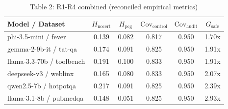 \begin{table}[h]
\centering
\small
\caption{Table 2: R1-R4 combined (reconciled empirical metrics)}
\label{tab:r1_r4_combined_old}
\begin{tabular}{l|cc|cc|c}
\hline
Model / Dataset & $H_{\mathrm{nocert}}$ & $H_{\mathrm{pcg}}$ & $\mathrm{Cov}_{\mathrm{control}}$ & $\mathrm{Cov}_{\mathrm{audit}}$ & $G_{\mathrm{safe}}$ \\
\hline
phi-3.5-mini / fever & 0.139 & 0.082 & 0.817 & 0.950 & 1.70x \\
gemma-2-9b-it / tat-qa & 0.174 & 0.091 & 0.825 & 0.950 & 1.91x \\
llama-3.3-70b / toolbench & 0.191 & 0.100 & 0.833 & 0.950 & 1.91x \\
deepseek-v3 / weblinx & 0.165 & 0.080 & 0.833 & 0.950 & 2.07x \\
qwen2.5-7b / hotpotqa & 0.217 & 0.091 & 0.825 & 0.950 & 2.39x \\
llama-3.1-8b / pubmedqa & 0.148 & 0.051 & 0.825 & 0.950 & 2.93x \\
\hline
\end{tabular}
\end{table}
